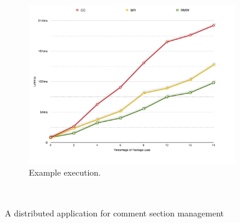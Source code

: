 \begin{figure}[t]
        \centering
	\begin{subfigure}[b]{0.48\textwidth}
	\end{subfigure}
	\hfill
	\begin{subfigure}[b]{0.49\textwidth}
	\includegraphics[scale=0.36]{Figures/latency.pdf}
	\caption{Example execution.}
	\label{subfig:comment_example}
	\end{subfigure} 
\\ \hrulefill
\caption{A distributed application for comment section
management}
\label{fig:comment_app}
\end{figure}


